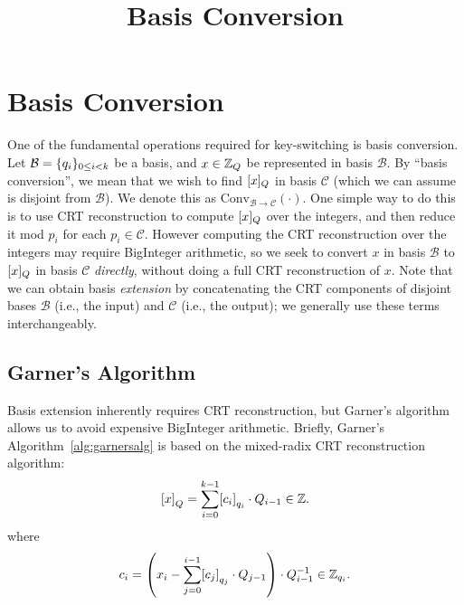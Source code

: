 \documentclass[../../fheimpl.tex]{subfiles}
\begin{document}
	\ifcompileasbook
	\else
	\title{Basis Conversion}
	\hypersetup{pageanchor=false}
	\maketitle
	\listoffixmes
	\tableofcontents
	\compileasbooktrue
	\hypersetup{pageanchor=true}
	\fi

\section{Basis Conversion}
\label{sec:basisext}
One of the fundamental operations required for key-switching is basis conversion. Let $\mathcal{B}=\{q_i\}_{0\le i< k}$ be a basis, and $x\in \mathbb{Z}_Q$ be represented in basis $\mathcal{B}$. By ``basis conversion'', we mean that we wish to find $[x]_Q$ in basis $\mathcal{C}$ (which we can assume is disjoint from $\mathcal{B}$). We denote this as $\mathrm{Conv}_{\mathcal{B}\rightarrow\mathcal{C}}(\cdot)$. One simple way to do this is to use CRT reconstruction to compute $[x]_Q$ over the integers, and then reduce it mod $p_i$ for each $p_i\in\mathcal{C}$. However computing the CRT reconstruction over the integers may require BigInteger arithmetic, so we seek to convert $x$ in basis $\mathcal{B}$ to $[x]_Q$ in basis $\mathcal{C}$ \emph{directly}, without doing a full CRT reconstruction of $x$. Note that we can obtain basis \emph{extension} by concatenating the CRT components of disjoint bases $\mathcal{B}$ (i.e., the input) and $\mathcal{C}$ (i.e., the output); we generally use these terms interchangeably.

\subsection{Garner's Algorithm}
Basis extension inherently requires CRT reconstruction, but Garner's algorithm~\cite[Section 5.6]{10.1145/1457838.1457864, geddes1992algorithms} allows us to avoid expensive BigInteger arithmetic. Briefly, Garner's Algorithm~\cref{alg:garnersalg} is based on the mixed-radix CRT reconstruction algorithm:
\[\bracks*{x}_Q = \sum_{i=0}^{k-1} \bracks*{c_i}_{q_i}\cdot Q_{i-1}\in\Z.\]
where 
\[c_i = \parens*{x_i - \sum_{j=0}^{i-1} \bracks*{c_j}_{q_j}\cdot Q_{j-1}}\cdot Q_{i-1}^{-1} \in\Z_{q_i}.\]
\end{document}
